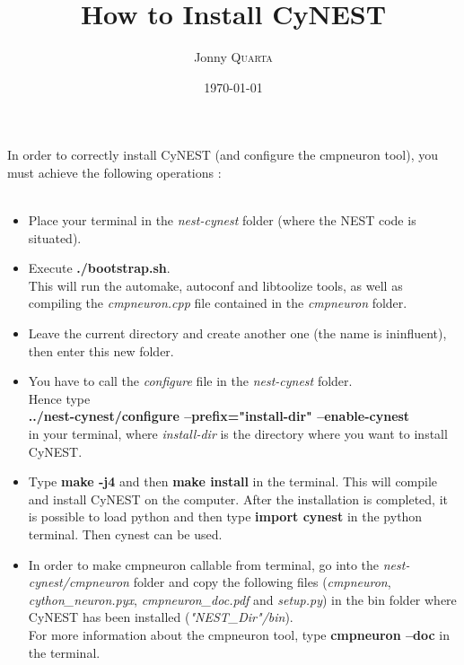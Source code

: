 \documentclass{article}
\title{How to Install CyNEST} %
\author{Jonny \textsc{Quarta}} %
\date{\today} %
\begin{document}
\maketitle %


\setlength\parindent{0pt} %

\renewcommand{\labelenumi}{\alph{enumi}.} %



In order to correctly install CyNEST (and configure the cmpneuron tool), you must achieve the following operations :
\\ \\
\begin{itemize}
\item Place your terminal in the \emph{nest-cynest} folder (where the NEST code is situated).

\item Execute \textbf{./bootstrap.sh}.\\ This will run the automake, autoconf and libtoolize tools, as well as compiling the \emph{cmpneuron.cpp} file contained in the \emph{cmpneuron} folder.

\item Leave the current directory and create another one (the name is ininfluent), then enter this new folder.

\item You have to call the \emph{configure} file in the \emph{nest-cynest} folder.\\Hence type \\ \textbf{../nest-cynest/configure --prefix="install-dir" --enable-cynest}\\ in your terminal, where \emph{install-dir} is the directory where you want to install CyNEST.

\item Type \textbf{make -j4} and then \textbf{make install} in the terminal. This will compile and install CyNEST on the computer. After the installation is completed, it is possible to  load python and then type \textbf{import cynest} in the python terminal. Then cynest can be used.

\item In order to make cmpneuron callable from terminal, go into the \emph{nest-cynest/cmpneuron} folder and copy the following files (\emph{cmpneuron}, \emph{cython\_neuron.pyx}, \emph{cmpneuron\_doc.pdf} and \emph{setup.py}) in the bin folder where CyNEST has been installed (\emph{"NEST\_Dir"/bin}).\\For more information about the cmpneuron tool, type \textbf{cmpneuron --doc} in the terminal.

\end{itemize}
\end{document}
